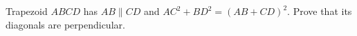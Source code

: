Trapezoid $ABCD$ has $AB\parallel CD$ and $AC^2+BD^2=(AB+CD)^2$. Prove that its diagonals are perpendicular.
